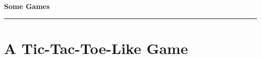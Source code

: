\documentclass[12pt]{article}
\begin{document}
\begin{center}
{\bf \Large Some Games}
\vspace{0.2cm}
\hrule
\end{center}

\section*{A Tic-Tac-Toe-Like Game}
\end{document}
